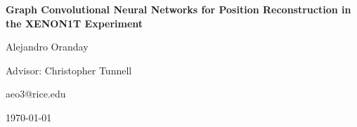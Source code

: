 \begin{titlepage}
	\begin{center}
	\vspace*{4cm}

	\Huge
	\textbf{Graph Convolutional Neural Networks for Position Reconstruction in the XENON1T Experiment}

	\vspace{3cm}
	\LARGE
	Alejandro Oranday

	\vspace{2cm}
	\normalsize Advisor: Christopher Tunnell

	\vspace{0.25cm}
	\normalsize aeo3@rice.edu

	\vfill
	\today
	\end{center}
\end{titlepage}

